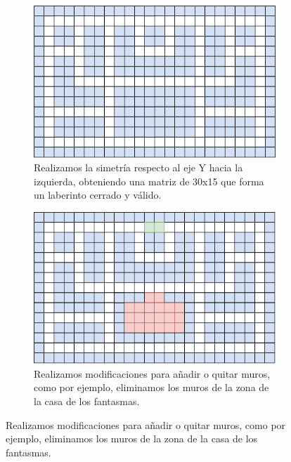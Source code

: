     \begin{figure}[H]
    \centering
    \begin{subfigure}[b]{0.95\textwidth}
            \centering
            \includegraphics[scale=0.45]{img/paso13.png}
            \caption{Realizamos la simetría respecto al eje Y hacia la izquierda, obteniendo una matriz de 30x15 que forma un laberinto cerrado y válido.}
        \end{subfigure}
        \par\bigskip
        \begin{subfigure}[b]{0.95\textwidth}
            \centering
            \includegraphics[scale=0.45]{img/paso14.png}
            \caption{Realizamos modificaciones para añadir o quitar muros, como por ejemplo, eliminamos los muros de la zona de la casa de los fantasmas.}
        \end{subfigure}
        

\end{figure}
